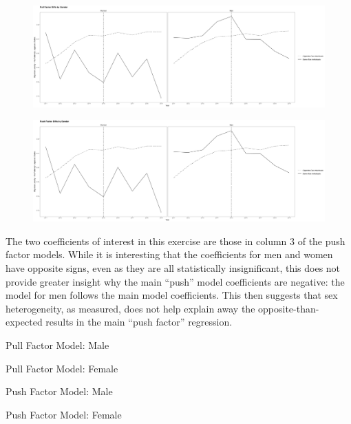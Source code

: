 \documentclass[12pt,letterpaper]{article}
\begin{document}
\begin{figure}[p]
    \centering
    \includegraphics[width=1\linewidth]{outputs/summary_stats/sex_post_diffs.png}
    \caption{}
    \label{fig: sex_post_diffs}
\end{figure}
\begin{figure}[p]
    \centering
    \includegraphics[width=1\linewidth]{outputs/summary_stats/sex_ante_diffs.png}
    \caption{}
    \label{fig: sex_ante_diffs}
\end{figure}

The two coefficients of interest in this exercise are those in column 3 of the push factor models. While it is interesting that the coefficients for men and women have opposite signs, even as they are all statistically insignificant, this does not provide greater insight why the main “push” model coefficients are negative: the model for men follows the main model coefficients. This then suggests that sex heterogeneity, as measured, does not help explain away the opposite-than-expected results in the main “push factor” regression.

\clearpage %
\begin{table}[p] %
    \centering
    \caption{Pull Factor Model: Male}
    \label{tab: male_expost_model}
    
\end{table}
\begin{table}[p]
    \centering
    \caption{Pull Factor Model: Female}
    \label{tab: female_expost_model}
    
\end{table}
\begin{table}[p] %
    \centering
    \caption{Push Factor Model: Male}
    \label{tab: male_exante_model}
    
\end{table}
\begin{table}[p] %
    \centering
    \caption{Push Factor Model: Female}
    \label{tab: female_exante_model}
    
\end{table}
\end{document}
